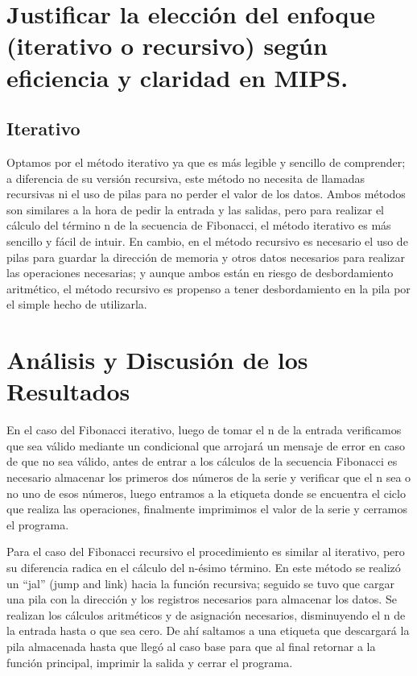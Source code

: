 \documentclass{article}
\begin{document}
\section{Justificar la elección del enfoque (iterativo o recursivo) según eficiencia y claridad en
MIPS.}
\subsection*{Iterativo}

Optamos por el método iterativo ya que es más legible y sencillo de comprender; a diferencia de su versión recursiva, este método no necesita de llamadas recursivas ni el uso de pilas para no perder el valor de los datos. Ambos métodos son similares a la hora de pedir la entrada y las salidas, pero para realizar el cálculo del término n de la secuencia de Fibonacci, el método iterativo es más sencillo y fácil de intuir. En cambio, en el método recursivo es necesario el uso de pilas para guardar la dirección de memoria y otros datos necesarios para realizar las operaciones necesarias; y aunque ambos están en riesgo de desbordamiento aritmético, el método recursivo es propenso a tener desbordamiento en la pila por el simple hecho de utilizarla.

\section{Análisis y Discusión de los Resultados}

En el caso del Fibonacci iterativo, luego de tomar el n de la entrada verificamos que sea válido mediante un condicional que arrojará un mensaje de error en caso de que no sea válido, antes de entrar a los cálculos de la secuencia Fibonacci es necesario almacenar los primeros dos números de la serie y verificar que el n sea o no uno de esos números, luego entramos a la etiqueta donde se encuentra el ciclo que realiza las operaciones, finalmente imprimimos el valor de la serie y cerramos el programa.

Para el caso del Fibonacci recursivo el procedimiento es similar al iterativo, pero su diferencia radica en el cálculo del n-ésimo término. En este método se realizó un “jal” (jump and link) hacia la función recursiva; seguido se tuvo que cargar una pila con la dirección y los registros necesarios para almacenar los datos. Se realizan los cálculos aritméticos y de asignación necesarios, disminuyendo el n de la entrada hasta o que sea cero. De ahí saltamos a una etiqueta que descargará la pila almacenada hasta que llegó al caso base para que al final retornar a la función principal, imprimir la salida y cerrar el programa.
\end{document}
